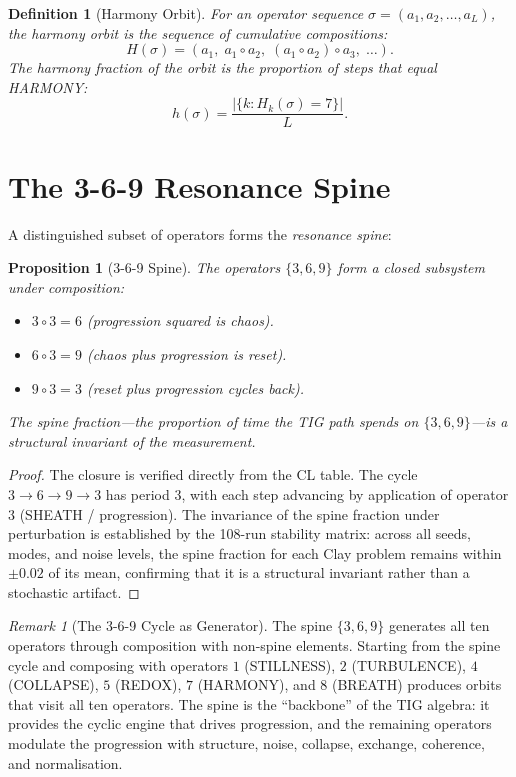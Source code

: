 \documentclass[12pt, openany]{book}
\newtheorem{proposition}[theorem]{Proposition}
\newtheorem{definition}[theorem]{Definition}
\theoremstyle{remark}
\newtheorem{remark}[theorem]{Remark}
\begin{document}
\begin{definition}[Harmony Orbit]\label{def:harmony-orbit}
For an operator sequence $\sigma = (a_1, a_2, \ldots, a_L)$, the
\emph{harmony orbit} is the sequence of cumulative compositions:
\[
  H(\sigma) = (a_1, \; a_1 \circ a_2, \; (a_1 \circ a_2) \circ a_3, \; \ldots).
\]
The \emph{harmony fraction} of the orbit is the proportion of steps
that equal HARMONY:
\[
  h(\sigma) = \frac{|\{k : H_k(\sigma) = 7\}|}{L}.
\]
\end{definition}


\section{The 3-6-9 Resonance Spine}

A distinguished subset of operators forms the \emph{resonance spine}:

\begin{proposition}[3-6-9 Spine]\label{prop:spine}
The operators $\{3, 6, 9\}$ form a closed subsystem under composition:
\begin{itemize}
  \item $3 \circ 3 = 6$ (progression squared is chaos).
  \item $6 \circ 3 = 9$ (chaos plus progression is reset).
  \item $9 \circ 3 = 3$ (reset plus progression cycles back).
\end{itemize}
The spine fraction---the proportion of time the TIG path spends on
$\{3, 6, 9\}$---is a structural invariant of the measurement.
\end{proposition}

\begin{proof}
The closure is verified directly from the CL table. The cycle
$3 \to 6 \to 9 \to 3$ has period 3, with each step advancing by
application of operator 3 (SHEATH / progression). The invariance
of the spine fraction under perturbation is established by the 108-run
stability matrix: across all seeds, modes, and noise levels, the spine
fraction for each Clay problem remains within $\pm 0.02$ of its mean,
confirming that it is a structural invariant rather than a stochastic artifact.
\end{proof}

\begin{remark}[The 3-6-9 Cycle as Generator]
The spine $\{3, 6, 9\}$ generates all ten operators through composition with
non-spine elements. Starting from the spine cycle and composing with operators
$1$ (STILLNESS), $2$ (TURBULENCE), $4$ (COLLAPSE), $5$ (REDOX), $7$ (HARMONY),
and $8$ (BREATH) produces orbits that visit all ten operators. The spine is the
``backbone'' of the TIG algebra: it provides the cyclic engine that drives
progression, and the remaining operators modulate the progression with
structure, noise, collapse, exchange, coherence, and normalisation.
\end{remark}
\end{document}
